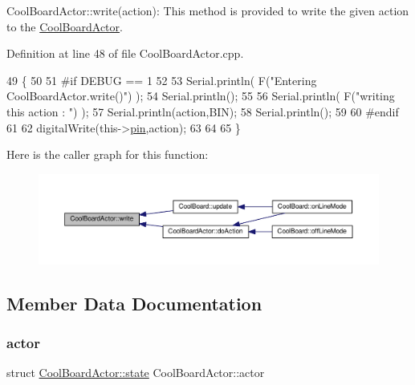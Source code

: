 Cool\+Board\+Actor\+::write(action)\+: This method is provided to write the given action to the \hyperlink{class_cool_board_actor}{Cool\+Board\+Actor}. 

Definition at line 48 of file Cool\+Board\+Actor.\+cpp.


\begin{DoxyCode}
49 \{
50 
51 \textcolor{preprocessor}{#if DEBUG == 1}
52 
53     Serial.println( F(\textcolor{stringliteral}{"Entering CoolBoardActor.write()"}) );
54     Serial.println();
55 
56     Serial.println( F(\textcolor{stringliteral}{"writing this action : "}) );
57     Serial.println(action,BIN);
58     Serial.println();
59 
60 \textcolor{preprocessor}{#endif }
61     
62     digitalWrite(this->\hyperlink{class_cool_board_actor_a8b5c0b41fe6033b68d9e1ed00bc2e122}{pin},action);
63     
64 
65 \}
\end{DoxyCode}
Here is the caller graph for this function\+:
\nopagebreak
\begin{figure}[H]
\begin{center}
\leavevmode
\includegraphics[width=350pt]{dc/d69/class_cool_board_actor_a958786ff01ea1056ee72c72d439f86da_icgraph}
\end{center}
\end{figure}


\subsection{Member Data Documentation}
\mbox{\label{class_cool_board_actor_a8f190db9f7a39fddbcef7f152da970e9}} 
\subsubsection{\texorpdfstring{actor}{actor}}
{\footnotesize\ttfamily struct \hyperlink{struct_cool_board_actor_1_1state}{Cool\+Board\+Actor\+::state} Cool\+Board\+Actor\+::actor\hspace{0.3cm}{\ttfamily [private]}}

